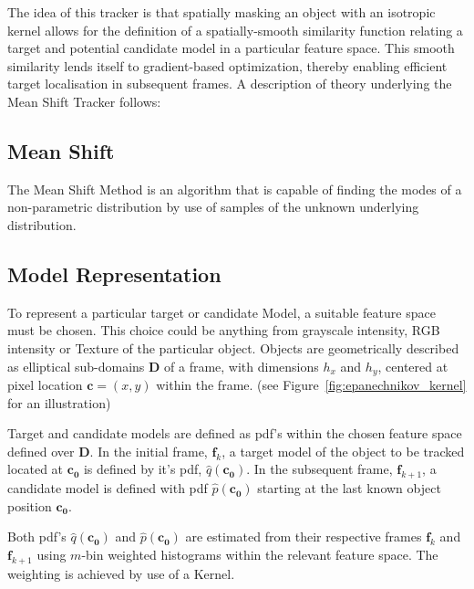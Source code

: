 The idea of this tracker is that spatially masking an object with an
isotropic kernel allows for the definition of a spatially-smooth similarity
function relating a target and potential candidate model in a particular feature
space. This smooth similarity lends itself to gradient-based optimization,
thereby enabling efficient target localisation in subsequent frames.
A description of theory underlying the Mean Shift Tracker follows:

\subsection{Mean Shift}\label{theoretical_framework_mean_shift}
The Mean Shift Method is an algorithm that is capable of finding the modes of a 
non-parametric distribution by use of samples of the unknown underlying distribution. 

\subsection{Model Representation}
To represent a particular target or candidate Model, a suitable feature space
must be chosen. This choice could be anything from grayscale intensity, RGB
intensity or Texture of the particular object. Objects are geometrically described 
as elliptical sub-domains $\mathbf{D}$ of a frame, with dimensions $h_x$ and
$h_y$, centered at pixel location $\mathbf{c}=(x,y)$ within the frame. (see
Figure~\ref{fig:epanechnikov_kernel} for an illustration)

Target and candidate models are defined as pdf's within the chosen feature
space defined over $\mathbf{D}$. In the initial frame, $\mathbf{f}_k$, a target
model of the object to be tracked located at $\mathbf{c_0}$ is defined by it's
pdf, $\hat{q}(\mathbf{c_0})$. In the subsequent frame, $\mathbf{f}_{k+1}$, a
candidate model is defined with pdf $\hat{p}(\mathbf{c_0})$ starting at the last
known object position $\mathbf{c_0}$. 

Both pdf's $\hat{q}(\mathbf{c_0})$ and $\hat{p}(\mathbf{c_0})$ are estimated from
their respective frames $\mathbf{f}_k$ and $\mathbf{f}_{k+1}$ using $m$-bin
weighted histograms within the relevant feature space. The weighting is achieved
by use of a Kernel. 

